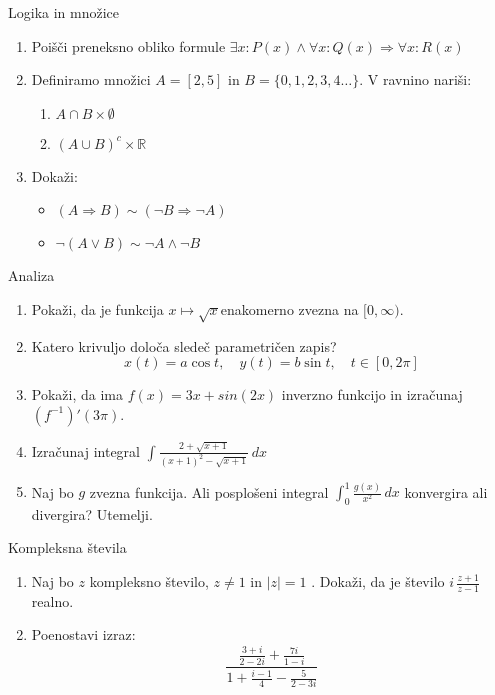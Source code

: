 \begin{frame}{Logika in množice}
	\begin{enumerate}
		\item
		Poišči preneksno obliko formule
		\(\exists x : P(x) \wedge \forall x : Q(x) \Rightarrow  \forall x : R(x)\)
		\item Definiramo množici \(A = [2,5] \) in \(B = \{0,1,2,3,4 \ldots\}\).
		V ravnino nariši:
		\begin{enumerate}
		   \item \(A \cap B \times \emptyset\)
		   \item \((A \cup B)^c \times \mathbb{R}\)
		\end{enumerate}
		\item
		Dokaži:
		\begin{itemize}
			\item \((A \Rightarrow B) \sim ( \neg B \Rightarrow \neg A)\)
			\item \(\neg (A \lor  B) \sim \neg A \wedge \neg B\)
		\end{itemize}
	\end{enumerate}
\end{frame}

\begin{frame}{Analiza}
	\begin{enumerate}
		\item
		Pokaži, da je funkcija \(x\mapsto \sqrt{x} \)enakomerno zvezna na \([0,\infty) \).
		\item 
		Katero krivuljo določa sledeč parametričen zapis?
		$$
		   x(t) = a \cos t, \quad   %
		   y(t) = b \sin t, \quad %
		   t \in [0, 2 \pi]
		$$ 
		\item
		Pokaži, da ima \(f(x)=3x + sin(2x)\) inverzno funkcijo in izračunaj \((f^{-1})'(3\pi)\).
		
		\item
		Izračunaj integral 
		\(\displaystyle \int \frac{2+\sqrt{x+1}}{(x+1)^2-\sqrt{x+1}} \,dx \)
		\item 
		Naj bo $g$ zvezna funkcija. Ali posplošeni integral 
		\(\int_{0}^{1} \frac{g(x)}{x^2} \,dx \)
		konvergira ali divergira? Utemelji.
	\end{enumerate}
\end{frame}

\begin{frame}{Kompleksna števila}
	\begin{enumerate}
		\item
		Naj bo $z$ kompleksno število, $z \ne 1$ in \(\left\lvert z \right\rvert = 1\) .
		Dokaži, da je število \( i \, \frac{z+1}{z-1} \) realno.
		\item
		Poenostavi izraz:
		\[\displaystyle \frac{\frac{3 + i}{2 - 2i} + \frac{7i}{1 - i}}{1+ \frac{i - 1}{4} - \frac{5}{2 - 3i}}\]
	\end{enumerate}
\end{frame}